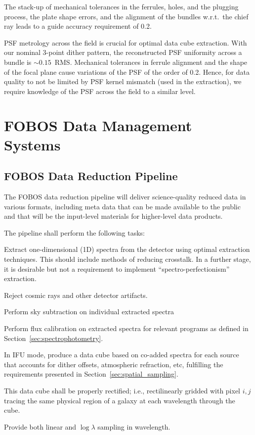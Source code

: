 \documentclass[11pt,a4paper,twoside,onecolumn,openany,final,oldfontcommands]{memoir}
\begin{document}
The stack-up of mechanical tolerances in the ferrules, holes, and the plugging process, the plate shape errors, and the alignment of the bundles w.r.t.\ the chief ray leads to a guide accuracy requirement of 0.2\arcsec.

PSF metrology across the field is crucial for optimal data cube extraction. With our nominal 3-point dither pattern, the reconstructed PSF uniformity across a bundle is $\sim 0.15$\arcsec\ RMS. Mechanical tolerances in ferrule alignment and  the shape of the focal plane cause variations of the PSF of the order of 0.2\arcsec. Hence, for data quality to not be limited by PSF kernel mismatch (used in the extraction),  we require knowledge of the PSF across the field to a similar level.


\chapter{FOBOS Data Management Systems}

\section{FOBOS Data Reduction Pipeline} \label{sec:data_reduction_pipeline}

The FOBOS data reduction pipeline will deliver science-quality reduced data in various formats, including meta data that can be made available to the public and that will be the input-level materials for higher-level data products. 

The pipeline shall perform the following tasks:

\begin{datarequirement}

\reqitem Extract one-dimensional (1D) spectra from the detector using optimal extraction techniques. This should include methods of reducing crosstalk. In a further stage, it is desirable but not a requirement to implement ``spectro-perfectionism'' extraction.

\reqitem Reject cosmic rays and other detector artifacts.

\reqitem Perform sky subtraction on individual extracted spectra

\reqitem Perform flux calibration on extracted spectra for relevant programs as defined in Section~\ref{sec:spectrophotometry}.

\reqitem In IFU mode, produce a data cube based on co-added spectra for each source that accounts for dither offsets, atmospheric refraction, etc, fulfilling the requirements presented in Section~\ref{sec:spatial_sampling}.

\reqitem This data cube shall be properly rectified; i.e., rectilinearly gridded with pixel $i,j$ tracing the same physical region of a galaxy at each wavelength through the cube.

\reqitem Provide both linear and $\log \lambda$ sampling in wavelength.

\end{datarequirement}
\end{document}

